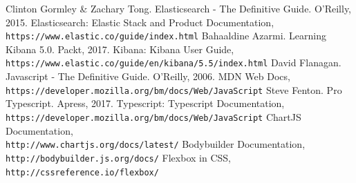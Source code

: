 \documentclass[a4paper, 12pt, english]{book}
\begin{document}

\begin{thebibliography}{99}
        Clinton Gormley \& Zachary Tong.
        Elasticsearch - The Definitive Guide.
        O'Reilly, 2015.
        Elasticsearch: Elastic Stack and Product Documentation,
        \\\texttt{https://www.elastic.co/guide/index.html}
        Bahaaldine Azarmi.
        Learning Kibana 5.0.
        Packt, 2017.
        Kibana: Kibana User Guide,
        \\\texttt{https://www.elastic.co/guide/en/kibana/5.5/index.html}
        David Flanagan.
        Javascript - The Definitive Guide.
        O'Reilly, 2006.
        MDN Web Docs,
        \\\texttt{https://developer.mozilla.org/bm/docs/Web/JavaScript}
        Steve Fenton.
        Pro Typescript.
        Apress, 2017.
        Typescript: Typescript Documentation,
        \\\texttt{https://developer.mozilla.org/bm/docs/Web/JavaScript}
        ChartJS Documentation,
        \\\texttt{http://www.chartjs.org/docs/latest/}
        Bodybuilder Documentation,
        \\\texttt{http://bodybuilder.js.org/docs/}
        Flexbox in CSS,
        \\\texttt{http://cssreference.io/flexbox/}
\end{thebibliography}

\end{document}

